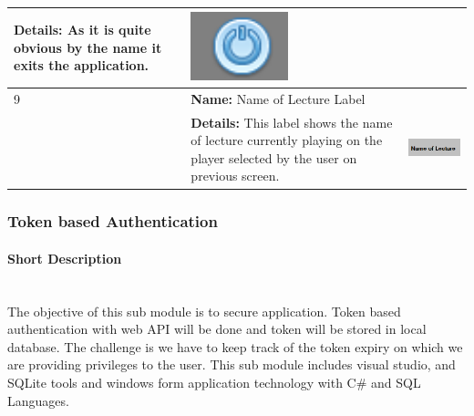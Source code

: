\documentclass[12pt]{article}
\begin{document}
\begin{center}
\begin{longtable}{|p{2cm}|p{7cm}|p{4cm}|}
\textbf{Details:} As it is quite obvious by the name it exits the application.& \begin{minipage}{.3\textwidth}
      \includegraphics[width=\linewidth, height=20mm]{Exit_Button}
    \end{minipage}\\
  \hline 9 &
  \textbf{Name:} Name of Lecture Label\\&
\textbf{Details:} This label shows the name of lecture currently playing on the player selected by the user on previous screen.& \begin{minipage}{.3\textwidth}
      \includegraphics[width=\linewidth, height=20mm]{NameOfLectureLabel}
    \end{minipage}\\
  \hline
     
\end{longtable}
\end{center}


\subsubsection{Token based Authentication}
\paragraph{Short Description}\mbox{}\\
The objective of this sub module is to secure application. Token based authentication with web API will be done and token will be stored in local database. The challenge is we have to keep track of the token expiry on which we are providing privileges to the user. This sub module includes visual studio, and SQLite tools and windows form application technology with C\# and SQL Languages.
\newpage
\end{document}
